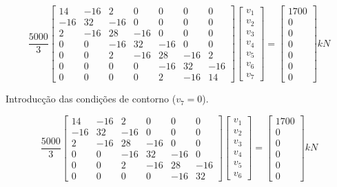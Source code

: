 \documentclass{article} %
\begin{document}
\begin{equation*}
\frac{5000}{3}\begin{bmatrix}
14& -16& 2& 0& 0& 0& 0\\
-16& 32& -16& 0& 0& 0& 0\\
2&-16& 28& -16& 0& 0& 0\\
0&0&-16&32& -16& 0& 0\\
0&0&2&-16& 28& -16& 2\\
0&0&0&0&-16&32& -16\\
0&0&0&0&2& -16& 14
\end{bmatrix}\begin{bmatrix}
v_1\\
v_2\\
v_3\\
v_4\\
v_5\\
v_6\\
v_7
\end{bmatrix}=\begin{bmatrix}
1700\\
0\\
0\\
0\\
0\\
0\\
0
\end{bmatrix}kN
\end{equation*}

Introducção das condições de contorno (\(v_7=0\)).

\begin{equation*}
\frac{5000}{3}\begin{bmatrix}
14& -16& 2& 0& 0& 0\\
-16& 32& -16& 0& 0& 0\\
2&-16& 28& -16& 0& 0\\
0&0&-16&32& -16& 0\\
0&0&2&-16& 28& -16\\
0&0&0&0&-16&32
\end{bmatrix}\begin{bmatrix}
v_1\\
v_2\\
v_3\\
v_4\\
v_5\\
v_6
\end{bmatrix}=\begin{bmatrix}
1700\\
0\\
0\\
0\\
0\\
0
\end{bmatrix}kN
\end{equation*}
\end{document}
